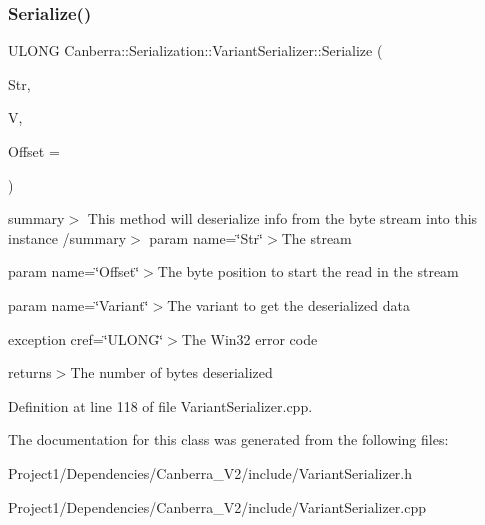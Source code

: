 \mbox{\label{class_canberra_1_1_serialization_1_1_variant_serializer_a0f428f6b680c3883c4a678d60a3e9a10_a0f428f6b680c3883c4a678d60a3e9a10}} 
\subsubsection{\texorpdfstring{Serialize()}{Serialize()}}
{\footnotesize\ttfamily U\+L\+O\+NG Canberra\+::\+Serialization\+::\+Variant\+Serializer\+::\+Serialize (\begin{DoxyParamCaption}\item[{\hyperlink{class_canberra_1_1_utility_1_1_core_1_1_byte_stream}{Canberra\+::\+Utility\+::\+Core\+::\+Byte\+Stream} \&}]{Str,  }\item[{\hyperlink{class_canberra_1_1_utility_1_1_core_1_1_variant}{Canberra\+::\+Utility\+::\+Core\+::\+Variant} \&}]{V,  }\item[{const L\+O\+NG}]{Offset = {} }\end{DoxyParamCaption})\hspace{0.3cm}{\ttfamily [static]}}

summary$>$ This method will deserialize info from the byte stream into this instance /summary$>$ param name=\char`\"{}\+Str\char`\"{}$>$The stream

param name=\char`\"{}\+Offset\char`\"{}$>$The byte position to start the read in the stream

param name=\char`\"{}\+Variant\char`\"{}$>$The variant to get the deserialized data

exception cref=\char`\"{}\+U\+L\+O\+N\+G\char`\"{}$>$The Win32 error code

returns$>$The number of bytes deserialized

Definition at line 118 of file Variant\+Serializer.\+cpp.



The documentation for this class was generated from the following files\+:\begin{DoxyCompactItemize}
\item 
Project1/\+Dependencies/\+Canberra\+\_\+\+V2/include/Variant\+Serializer.\+h\item 
Project1/\+Dependencies/\+Canberra\+\_\+\+V2/include/Variant\+Serializer.\+cpp\end{DoxyCompactItemize}
